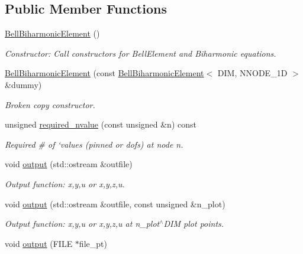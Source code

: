 \subsection*{Public Member Functions}
\begin{DoxyCompactItemize}
\item 
\hyperlink{classoomph_1_1BellBiharmonicElement_aacb9d267c8aa65057c2c0248b0ef669e}{Bell\+Biharmonic\+Element} ()
\begin{DoxyCompactList}\small\item\em Constructor\+: Call constructors for Bell\+Element and Biharmonic equations. \end{DoxyCompactList}\item 
\hyperlink{classoomph_1_1BellBiharmonicElement_a7fc1038d4814433b0b9e998958309ce5}{Bell\+Biharmonic\+Element} (const \hyperlink{classoomph_1_1BellBiharmonicElement}{Bell\+Biharmonic\+Element}$<$ D\+IM, N\+N\+O\+D\+E\+\_\+1D $>$ \&dummy)
\begin{DoxyCompactList}\small\item\em Broken copy constructor. \end{DoxyCompactList}\item 
unsigned \hyperlink{classoomph_1_1BellBiharmonicElement_a342b59354c4d109da9cda12aad79f293}{required\+\_\+nvalue} (const unsigned \&n) const
\begin{DoxyCompactList}\small\item\em Required \# of `values\textquotesingle{} (pinned or dofs) at node n. \end{DoxyCompactList}\item 
void \hyperlink{classoomph_1_1BellBiharmonicElement_a857d5d7ebdd9eef2b14ef3548fe60e8f}{output} (std\+::ostream \&outfile)
\begin{DoxyCompactList}\small\item\em Output function\+: x,y,u or x,y,z,u. \end{DoxyCompactList}\item 
void \hyperlink{classoomph_1_1BellBiharmonicElement_a558bc65d41a06e864e62eba4d3aa4fa5}{output} (std\+::ostream \&outfile, const unsigned \&n\+\_\+plot)
\begin{DoxyCompactList}\small\item\em Output function\+: x,y,u or x,y,z,u at n\+\_\+plot$^\wedge$\+D\+IM plot points. \end{DoxyCompactList}\item 
void \hyperlink{classoomph_1_1BellBiharmonicElement_a438ad259cc2614b7987542126d92d015}{output} (F\+I\+LE $\ast$file\+\_\+pt)

\end{DoxyCompactItemize}
